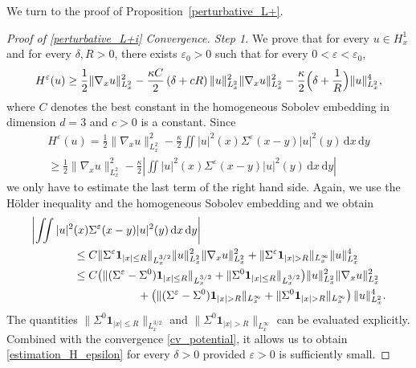 \documentclass[10pt]{amsart}
\theoremstyle{definition}
\newenvironment{ProofOf}[1]{\begin{proof}[Proof of #1]}{\end{proof}}
\newcommand{\ud}{\, {\mathrm{d}}}
\begin{document}
We turn to the proof of Proposition~\ref{perturbative_L+}.

\begin{ProofOf}{\eqref{perturbative_L+i} Convergence. Step 1}
We prove that for every $u\in H_{x}^{1}$ and for every $\delta, R>0$, there exists $\varepsilon_{0}>0$ such that for every $0<\varepsilon<\varepsilon_{0}$,
\begin{equation}\label{estimation_H_epsilon}
H^{\varepsilon}(u)\geq\frac{1}{2}\|\nabla_{x}u\|_{L_{x}^{2}}^{2}-\frac{\kappa C}{2}\left(\delta+cR\right)\|u\|_{L_{x}^{2}}^{2}\|\nabla_{x}u\|_{L_{x}^{2}}^{2}-\frac{\kappa}{2}\Bigl(\delta+\frac{1}{R}\Bigr)\|u\|_{L_{x}^{2}}^{4},
\end{equation}
where $C$ denotes the best constant in the homogeneous Sobolev embedding in dimension $d=3$ and $c>0$ is a constant. Since
\begin{multline*}
H^{\varepsilon}(u)=\frac{1}{2}\|\nabla_{x}u\|_{L_{x}^{2}}^{2}-\frac{\kappa}{2}\iint|u|^{2}(x)\Sigma^{\varepsilon}(x-y)|u|^{2}(y)\ud x\ud y\\
\geq\frac{1}{2}\|\nabla_{x}u\|_{L_{x}^{2}}^{2}-\frac{\kappa}{2}\left|\iint|u|^{2}(x)\Sigma^{\varepsilon}(x-y)|u|^{2}(y)\ud x\ud y\right|
\end{multline*}
we only have to estimate the last term of the right hand side. Again, we use the Hölder inequality and the homogeneous Sobolev embedding and we obtain
\begin{align*}
\biggl|\iint|u|^{2}&(x)\Sigma^{\varepsilon}(x-y)|u|^{2}(y)\ud x\ud y\biggr|
\\
&\leq C\|\Sigma^{\varepsilon}\mathbf{1}_{|x|\leq R}\|_{L_{x}^{3/2}}\|u\|_{L_{x}^{2}}^{2}\|\nabla_{x}u\|_{L_{x}^{2}}^{2}+\|\Sigma^{\varepsilon}\mathbf{1}_{|x|>R}\|_{L_{x}^{\infty}}\|u\|_{L_{x}^{2}}^{4}\\
&\leq C\bigl(\|(\Sigma^{\varepsilon}-\Sigma^{0})\mathbf{1}_{|x|\leq R}\|_{L_{x}^{3/2}}+\|\Sigma^{0}\mathbf{1}_{|x|\leq R}\|_{L_{x}^{3/2}}\bigr)\|u\|_{L_{x}^{2}}^{2}\|\nabla_{x}u\|_{L_{x}^{2}}^{2}\\
&\hspace*{2cm}+\left(\|(\Sigma^{\varepsilon}-\Sigma^{0})\mathbf{1}_{|x|>R}\|_{L_{x}^{\infty}}+\|\Sigma^{0}\mathbf{1}_{|x|>R}\|_{L_{x}^{\infty}}\right)\|u\|_{L_{x}^{2}}^{4}.
\end{align*}
The quantities $\|\Sigma^{0}\mathbf{1}_{|x|\leq R}\|_{L_{x}^{3/2}}$ and $\|\Sigma^{0}\mathbf{1}_{|x|>R}\|_{L_{x}^{\infty}}$ can be evaluated
explicitly. Combined with the convergence \eqref{cv_potential}, it allows us to obtain \eqref{estimation_H_epsilon} for every $\delta>0$ provided $\varepsilon>0$ is sufficiently small.


\end{ProofOf}
\end{document}
